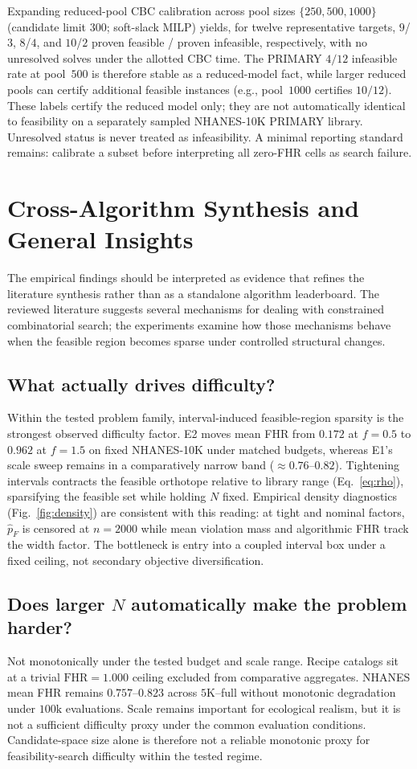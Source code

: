 \documentclass[lettersize,journal]{IEEEtran}
\begin{document}
Expanding reduced-pool CBC calibration across pool sizes $\{250,500,1000\}$ (candidate limit $300$; soft-slack MILP) yields, for twelve representative targets, $9$/$3$, $8$/$4$, and $10$/$2$ proven feasible / proven infeasible, respectively, with no unresolved solves under the allotted CBC time.
The PRIMARY $4/12$ infeasible rate at pool~$500$ is therefore stable as a reduced-model fact, while larger reduced pools can certify additional feasible instances (e.g., pool~$1000$ certifies $10/12$).
These labels certify the reduced model only; they are not automatically identical to feasibility on a separately sampled NHANES-10K PRIMARY library.
Unresolved status is never treated as infeasibility.
A minimal reporting standard remains: calibrate a subset before interpreting all zero-FHR cells as search failure.

\section{Cross-Algorithm Synthesis and General Insights}
\label{sec:discuss}
The empirical findings should be interpreted as evidence that refines the literature synthesis rather than as a standalone algorithm leaderboard.
The reviewed literature suggests several mechanisms for dealing with constrained combinatorial search; the experiments examine how those mechanisms behave when the feasible region becomes sparse under controlled structural changes.

\subsection{What actually drives difficulty?}
Within the tested problem family, interval-induced feasible-region sparsity is the strongest observed difficulty factor.
E2 moves mean FHR from $0.172$ at $f=0.5$ to $0.962$ at $f=1.5$ on fixed NHANES-10K under matched budgets, whereas E1's scale sweep remains in a comparatively narrow band ($\approx 0.76$--$0.82$).
Tightening intervals contracts the feasible orthotope relative to library range (Eq.~\eqref{eq:rho}), sparsifying the feasible set while holding $N$ fixed.
Empirical density diagnostics (Fig.~\ref{fig:density}) are consistent with this reading: at tight and nominal factors, $\hat p_F$ is censored at $n{=}2000$ while mean violation mass and algorithmic FHR track the width factor.
The bottleneck is entry into a coupled interval box under a fixed ceiling, not secondary objective diversification.

\subsection{Does larger $N$ automatically make the problem harder?}
Not monotonically under the tested budget and scale range.
Recipe catalogs sit at a trivial $\mathrm{FHR}=1.000$ ceiling excluded from comparative aggregates.
NHANES mean FHR remains $0.757$--$0.823$ across $5\mathrm{K}$--full without monotonic degradation under $100\mathrm{k}$ evaluations.
Scale remains important for ecological realism, but it is not a sufficient difficulty proxy under the common evaluation conditions.
Candidate-space size alone is therefore not a reliable monotonic proxy for feasibility-search difficulty within the tested regime.
\end{document}
